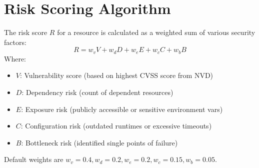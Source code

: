 \section{Risk Scoring Algorithm}
The risk score $R$ for a resource is calculated as a weighted sum of various security factors:
\begin{equation}
	R = w_v V + w_d D + w_e E + w_c C + w_b B
\end{equation}
Where:
\begin{itemize}
    \item $V$: Vulnerability score (based on highest CVSS score from NVD)
    \item $D$: Dependency risk (count of dependent resources)
    \item $E$: Exposure risk (publicly accessible or sensitive environment vars)
    \item $C$: Configuration risk (outdated runtimes or excessive timeouts)
    \item $B$: Bottleneck risk (identified single points of failure)
\end{itemize}
Default weights are $w_v=0.4, w_d=0.2, w_e=0.2, w_c=0.15, w_b=0.05$.
